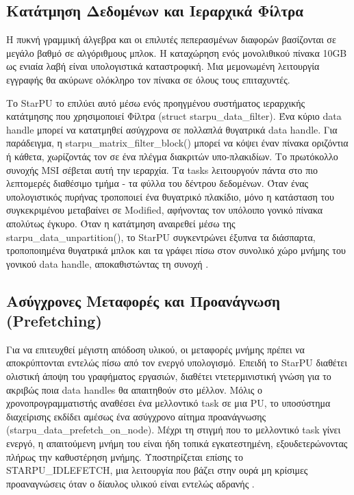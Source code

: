\subsection{Κατάτμηση Δεδομένων και Ιεραρχικά Φίλτρα}

Η πυκνή γραμμική άλγεβρα και οι επιλυτές πεπερασμένων διαφορών βασίζονται σε μεγάλο βαθμό σε αλγόριθμους μπλοκ. Η καταχώρηση ενός μονολιθικού πίνακα 10GB ως ενιαία λαβή είναι υπολογιστικά καταστροφική. Μια μεμονωμένη λειτουργία εγγραφής θα ακύρωνε ολόκληρο τον πίνακα σε όλους τους επιταχυντές. 

Το StarPU το επιλύει αυτό μέσω ενός προηγμένου συστήματος ιεραρχικής κατάτμησης που χρησιμοποιεί Φίλτρα (struct starpu\_data\_filter). Ένα κύριο data handle μπορεί να κατατμηθεί ασύγχρονα σε πολλαπλά θυγατρικά data handle. Για παράδειγμα, η starpu\_matrix\_filter\_block() μπορεί να κόψει έναν πίνακα οριζόντια ή κάθετα, χωρίζοντάς τον σε ένα πλέγμα διακριτών υπο-πλακιδίων. Το πρωτόκολλο συνοχής MSI σέβεται αυτή την ιεραρχία. Τα tasks λειτουργούν πάντα στο πιο λεπτομερές διαθέσιμο τμήμα - τα φύλλα του δέντρου δεδομένων. Όταν ένας υπολογιστικός πυρήνας τροποποιεί ένα θυγατρικό πλακίδιο, μόνο η κατάσταση του συγκεκριμένου μεταβαίνει σε Modified, αφήνοντας τον υπόλοιπο γονικό πίνακα απολύτως έγκυρο. Όταν η κατάτμηση αναιρεθεί μέσω της starpu\_data\_unpartition(), το StarPU συγκεντρώνει έξυπνα τα διάσπαρτα, τροποποιημένα θυγατρικά μπλοκ και τα γράφει πίσω στον συνολικό χώρο μνήμης του γονικού data handle, αποκαθιστώντας τη συνοχή \cite{starpu2025handbook,starpu_dev_manual}.

\subsection{Ασύγχρονες Μεταφορές και Προανάγνωση (Prefetching)}

Για να επιτευχθεί μέγιστη απόδοση υλικού, οι μεταφορές μνήμης πρέπει να αποκρύπτονται εντελώς πίσω από τον ενεργό υπολογισμό. Επειδή το StarPU διαθέτει ολιστική άποψη του γραφήματος εργασιών, διαθέτει ντετερμινιστική γνώση για το ακριβώς ποια data handles θα απαιτηθούν στο μέλλον. Μόλις ο χρονοπρογραμματιστής αναθέσει ένα μελλοντικό task σε μια PU, το υποσύστημα διαχείρισης εκδίδει αμέσως ένα ασύγχρονο αίτημα προανάγνωσης (starpu\_data\_prefetch\_on\_node). Μέχρι τη στιγμή που το μελλοντικό task γίνει ενεργό, η απαιτούμενη μνήμη του είναι ήδη τοπικά εγκατεστημένη, εξουδετερώνοντας πλήρως την καθυστέρηση μνήμης. Υποστηρίζεται επίσης το STARPU\_IDLEFETCH, μια λειτουργία που βάζει στην ουρά μη κρίσιμες προαναγνώσεις όταν ο δίαυλος υλικού είναι εντελώς αδρανής \cite{starpu2025handbook,starpu_dev_manual}.

